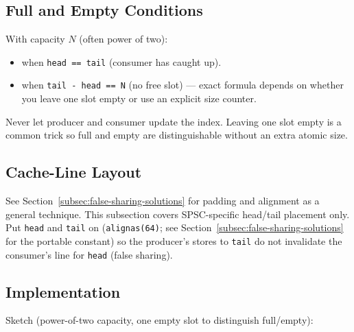\subsection{Full and Empty Conditions}
\label{subsec:spsc-full-empty}
With capacity $N$ (often power of two):
\begin{itemize}
    \item {} when \texttt{head == tail} (consumer has caught up).
    \item {} when \texttt{tail - head == N} (no free slot) --- exact formula depends on 
          whether you leave one slot empty or use an explicit size counter.
\end{itemize}
Never let producer and consumer update the  index. Leaving one slot empty 
is a common trick so full and empty are distinguishable without an extra atomic size.

\subsection{Cache-Line Layout}
\label{subsec:spsc-cache-line-layout}
See Section~\ref{subsec:false-sharing-solutions} for padding and alignment as a general technique. 
This subsection covers SPSC-specific head/tail placement only.
\newline
Put \texttt{head} and \texttt{tail} on  (\texttt{alignas(64)}; 
see Section~\ref{subsec:false-sharing-solutions} for the portable constant) so the 
producer's stores to \texttt{tail} do not invalidate the consumer's line for \texttt{head} 
(false sharing).

\subsection{Implementation}
\label{subsec:spsc-implementation}
Sketch (power-of-two capacity, one empty slot to distinguish full/empty):

